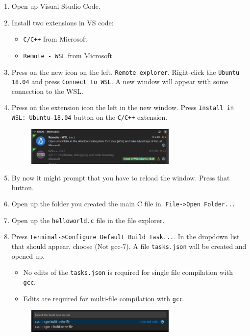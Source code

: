 \begin{enumerate}
    \item Open up Visual Studio Code.
    \item Install two extensions in VS code:
        \begin{itemize}
            \item \texttt{C/C++} from Microsoft
            \item \texttt{Remote - WSL} from Microsoft
        \end{itemize}
    \item Press on the new icon on the left, \texttt{Remote explorer}. Right-click the \texttt{Ubuntu 18.04} and press \texttt{Connect to WSL}. A new window will appear with some connection to the WSL.
    \item Press on the extension icon the left in the new window. Press \texttt{Install in WSL: Ubuntu-18.04} button on the \texttt{C/C++} extension.
        \begin{figure}[H]
            \centering
            \includegraphics[width=0.7\textwidth]{Figures/WSL/vscode_extensions.PNG}
        \end{figure}
    \item By now it might prompt that you have to reload the window. Press that button.
    \item Open up the folder you created the main C file in. \texttt{File->Open Folder...}
    \item Open up the \texttt{helloworld.c} file in the file explorer.
    \item Press \texttt{Terminal->Configure Default Build Task...}. In the dropdown list that should appear, choose  (Not gcc-7). A file \texttt{tasks.json} will be created and opened up.
    \begin{itemize}
        \item No edits of the \texttt{tasks.json} is required for single file compilation with \texttt{gcc}.
        \item Edits are required for multi-file compilation with \texttt{gcc}.
    \end{itemize}
        \begin{figure}[H]
            \centering
            \includegraphics[width=0.7\textwidth]{Figures/WSL/vscode_compiler.PNG}
        \end{figure}
\end{enumerate}


